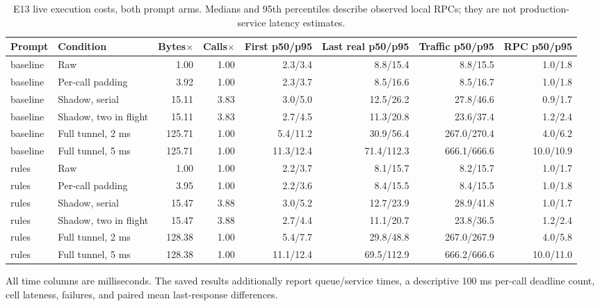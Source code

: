 \begin{table}[htbp]\centering\footnotesize
\caption{E13 live execution costs, both prompt arms. Medians and 95th percentiles describe observed local RPCs; they are not production-service latency estimates.}
\begin{tabular}{llrrrrrr}\toprule
Prompt & Condition & Bytes$\times$ & Calls$\times$ & First p50/p95 & Last real p50/p95 & Traffic p50/p95 & RPC p50/p95\\\midrule
baseline & Raw & 1.00 & 1.00 & 2.3/3.4 & 8.8/15.4 & 8.8/15.5 & 1.0/1.8\\
baseline & Per-call padding & 3.92 & 1.00 & 2.3/3.7 & 8.5/16.6 & 8.5/16.7 & 1.0/1.8\\
baseline & Shadow, serial & 15.11 & 3.83 & 3.0/5.0 & 12.5/26.2 & 27.8/46.6 & 0.9/1.7\\
baseline & Shadow, two in flight & 15.11 & 3.83 & 2.7/4.5 & 11.3/20.8 & 23.6/37.4 & 1.2/2.4\\
baseline & Full tunnel, 2 ms & 125.71 & 1.00 & 5.4/11.2 & 30.9/56.4 & 267.0/270.4 & 4.0/6.2\\
baseline & Full tunnel, 5 ms & 125.71 & 1.00 & 11.3/12.4 & 71.4/112.3 & 666.1/666.6 & 10.0/10.9\\
rules & Raw & 1.00 & 1.00 & 2.2/3.7 & 8.1/15.7 & 8.2/15.7 & 1.0/1.7\\
rules & Per-call padding & 3.95 & 1.00 & 2.2/3.6 & 8.4/15.5 & 8.4/15.5 & 1.0/1.8\\
rules & Shadow, serial & 15.47 & 3.88 & 3.0/5.2 & 12.7/23.9 & 28.9/41.8 & 1.0/1.7\\
rules & Shadow, two in flight & 15.47 & 3.88 & 2.7/4.4 & 11.1/20.7 & 23.8/36.5 & 1.2/2.4\\
rules & Full tunnel, 2 ms & 128.38 & 1.00 & 5.4/7.7 & 29.8/48.8 & 267.0/267.9 & 4.0/5.8\\
rules & Full tunnel, 5 ms & 128.38 & 1.00 & 11.1/12.4 & 69.5/112.9 & 666.2/666.6 & 10.0/11.0\\
\bottomrule\end{tabular}
\par\smallskip All time columns are milliseconds. The saved results additionally report queue/service times, a descriptive 100 ms per-call deadline count, cell lateness, failures, and paired mean last-response differences.
\end{table}
